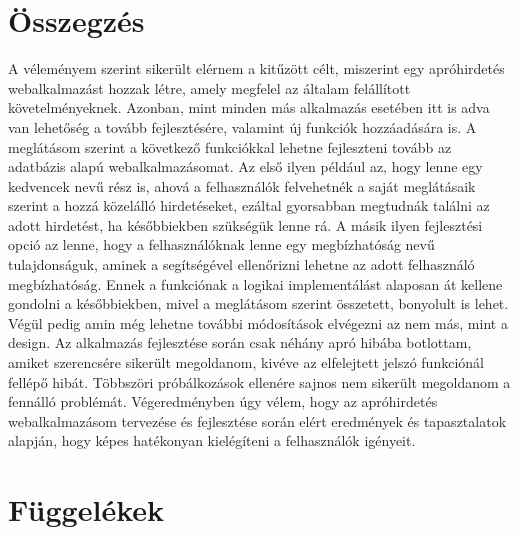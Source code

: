 \documentclass[]{thesis-ekf}
\theoremstyle{definition}
\theoremstyle{remark}
\begin{document}
	\chapter*{Összegzés}
		A véleményem szerint sikerült elérnem a kitűzött célt, miszerint egy apróhirdetés webalkalmazást hozzak létre, amely megfelel az általam felállított követelményeknek. Azonban, mint minden más alkalmazás esetében itt is adva van lehetőség a tovább fejlesztésére, valamint új funkciók hozzáadására is. A meglátásom szerint a következő funkciókkal lehetne fejleszteni tovább az adatbázis alapú webalkalmazásomat. Az első ilyen például az, hogy lenne egy kedvencek nevű rész is, ahová a felhasználók felvehetnék a saját meglátásaik szerint a hozzá közelálló hirdetéseket, ezáltal gyorsabban megtudnák találni az adott hirdetést, ha későbbiekben szükségük lenne rá. A másik ilyen fejlesztési opció az lenne, hogy a felhasználóknak lenne egy megbízhatóság nevű tulajdonságuk, aminek a segítségével ellenőrizni lehetne az adott felhasználó megbízhatóság. Ennek a funkciónak a logikai implementálást alaposan át kellene gondolni a későbbiekben, mivel a meglátásom szerint összetett, bonyolult is lehet. Végül pedig amin még lehetne további módosítások elvégezni az nem más, mint a design. Az alkalmazás fejlesztése során csak néhány apró hibába botlottam, amiket szerencsére sikerült megoldanom, kivéve az elfelejtett jelszó funkciónál fellépő hibát. Többszöri próbálkozások ellenére sajnos nem sikerült megoldanom a fennálló problémát. Végeredményben úgy vélem, hogy az apróhirdetés webalkalmazásom tervezése és fejlesztése során elért eredmények és tapasztalatok alapján, hogy képes hatékonyan kielégíteni a felhasználók igényeit.
		
	\chapter*{Függelékek}\label{ch-fugg}
\end{document}

